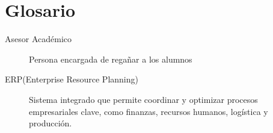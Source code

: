 \documentclass[12pt,letterpaper,spanish]{report}
\begin{document}
\newpage
\chapter{Glosario}

\begin{description}
  \item[Asesor Académico] Persona encargada de regañar a los alumnos
\end{description}

\begin{description}
  \item[ERP(Enterprise Resource Planning)]  Sistema integrado que permite coordinar y 
  optimizar procesos empresariales clave, como finanzas, recursos humanos, logística y producción. 

\end{description}
\end{document}
